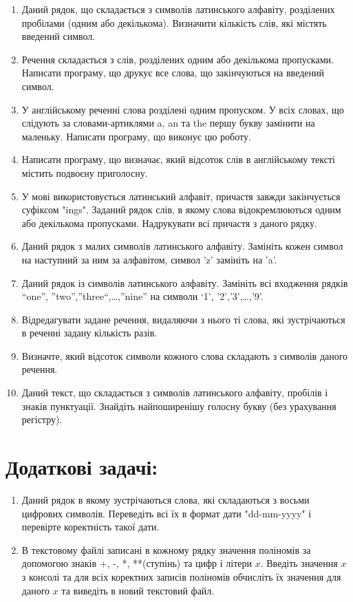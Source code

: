 \documentclass[a5paper,titlepage,openany,twoside,draft]{book_unv}%
\begin{document}
\begin{enumerate}
\item
  Даний рядок, що складається з символів латинського алфавіту,
  розділених пробілами (одним або декількома). Визначити кількість слів,
  які містять введений символ.
\item
  Речення складається з слів, розділених одним або декількома
  пропусками. Написати програму, що друкує все слова, що закінчуються на
  введений символ.
\item
  У англійському реченні слова розділені одним пропуском. У всіх словах, що 
слідують за словами-артиклями a, an та the першу букву замінити на маленьку.
  Написати програму, що виконує цю роботу.
\item
  Написати програму, що визначає, який відсоток слів в англійському
  тексті містить подвоєну приголосну.
\item
  У мові використовується латинський алфавіт, причастя завжди
  закінчується суфіксом "ings". Заданий рядок слів, в якому слова
  відокремлюються одним або декількома пропусками. Надрукувати всі причастя
  з даного рядку.
\item
  Даний рядок з малих символів латинського алфавіту. Замініть кожен
  символ на наступний за ним за алфавітом, символ 'z' замініть на 'a'.
\item
  Даний рядок із символів латинського алфавіту. Замініть всі входження
  рядків ``one'', ''two'',''three``,\ldots{},''nine'' на символи `1',
  '2','3',\ldots{},'9'.
\item
  Відредагувати задане речення, видаляючи з нього ті слова, які
  зустрічаються в реченні задану кількість разів.
\item
  Визначте, який відсоток символи кожного слова складають з символів
  даного речення.
\item
  Даний текст, що складається з символів латинського алфавіту, пробілів і
  знаків пунктуації. Знайдіть найпоширенішу голосну букву (без
  урахування регістру).

\end{enumerate}

\section{Додаткові задачі:}

\begin{enumerate}
\def\labelenumi{\arabic{enumi})}
\setcounter{enumi}{27}
\item
  Даний рядок в якому зустрічаються слова, які складаються з восьми
  цифрових символів. Переведіть всі їх в формат дати "dd-mm-yyyy" і
  перевірте коректність такої дати.
\item
  В текстовому файлі записані в кожному рядку значення поліномів за
  допомогою знаків +, -, *, **(ступінь) та цифр і літери $x$. Введіть
  значення $x$ з консолі та для всіх коректних записів поліномів обчисліть
  їх значення для даного $x$ та виведіть в новий текстовий файл.
\end{enumerate}
\end{document}
